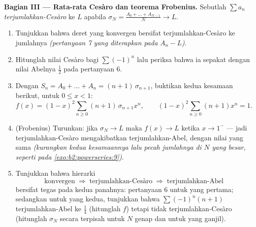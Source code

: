 \begin{problem}
\medskip
\noindent\textbf{Bagian III --- Rata-rata Cesàro dan teorema
Frobenius.} Sebutlah $\sum a_n$ \emph{terjumlahkan-Cesàro} ke $L$
apabila $\sigma_N = \frac{A_0 + \dots + A_{N-1}}{N} \to L$.
\begin{enumerate}[resume]
  \item Tunjukkan bahwa deret yang konvergen bersifat
        terjumlahkan-Cesàro ke jumlahnya \emph{(pertanyaan 7 yang
        diterapkan pada $A_n - L$)}.
  \item Hitunglah nilai Cesàro bagi $\sum(-1)^n$ lalu periksa bahwa ia
        sepakat dengan nilai Abelnya $\frac12$ pada pertanyaan 6.
  \item Dengan $S_n = A_0 + \dots + A_n = (n+1)\,\sigma_{n+1}$,
        buktikan kedua kesamaan berikut, untuk $0 \leq x < 1$:
        \[
        f(x) = (1-x)^2\sum_{n\geq0}(n+1)\,\sigma_{n+1}x^n,
        \qquad
        (1-x)^2\sum_{n\geq0}(n+1)x^n = 1 .
        \]
  \item (Frobenius) Turunkan: jika $\sigma_N \to L$ maka $f(x) \to
        L$ ketika $x \to 1^-$ --- jadi terjumlahkan-Cesàro
        mengakibatkan terjumlahkan-Abel, dengan nilai yang sama
        \emph{(kurangkan kedua kesamaannya lalu pecah jumlahnya di $N$
        yang besar, seperti pada \cref{exo:b2:powerseries:9})}.
  \item Tunjukkan bahwa hierarki
        \[
        \text{konvergen} \;\Longrightarrow\;
        \text{terjumlahkan-Cesàro} \;\Longrightarrow\;
        \text{terjumlahkan-Abel}
        \]
        bersifat tegas pada kedua panahnya: pertanyaan 6 untuk yang
        pertama; sedangkan untuk yang kedua, tunjukkan bahwa
        $\sum(-1)^n(n+1)$ terjumlahkan-Abel ke $\frac14$ (hitunglah
        $f$) tetapi tidak terjumlahkan-Cesàro (hitunglah $\sigma_N$
        secara terpisah untuk $N$ genap dan untuk yang ganjil).
\end{enumerate}


\end{problem}

